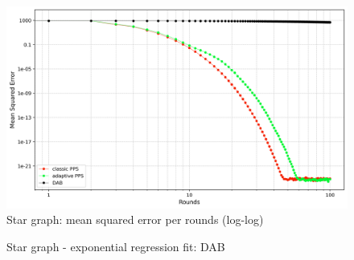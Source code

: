 \begin{figure}[]
    \centering
    \includegraphics[width=\textwidth]{figures/Simulation_outcomes/StarGraph/DAB_vs_PPS_SG_r100_n1024_averaged_loglog.png}
    \caption{Star graph: mean squared error per rounds (log-log)}
    \label{fig:stargraphMSEperRoundLogLog}
\end{figure}
\begin{figure}[]
    \centering
    \caption{Star graph - exponential regression fit: DAB}
    \label{fig:dabStarModelFit}
\end{figure}
